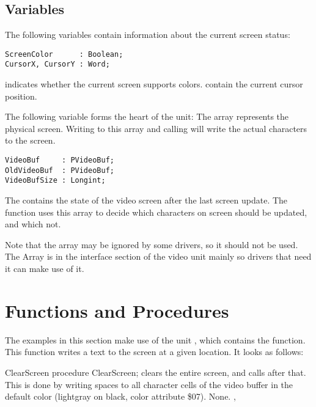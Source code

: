 \subsection{Variables}
The following variables contain information about the current screen
status:
\begin{verbatim}
ScreenColor      : Boolean;
CursorX, CursorY : Word;
\end{verbatim}
 indicates whether the current screen supports colors.
 contain the current cursor position.

The following variable forms the heart of the  unit: The
 array represents the physical screen. Writing to this
array and calling  will write the actual characters
to the screen. 
\begin{verbatim}
VideoBuf     : PVideoBuf;
OldVideoBuf  : PVideoBuf;
VideoBufSize : Longint;
\end{verbatim}
The  contains the state of the video screen after the last
screen update. The  function uses this array to decide
which characters on screen should be updated, and which not. 

Note that the  array may be ignored by some drivers, so
it should not be used. The Array is in the interface section of the video
unit mainly so drivers that need it can make use of it. 

\section{Functions and Procedures}

The examples in this section make use of the unit , which 
contains the  function. This function writes a text to the
screen at a given location. It looks as follows:


\begin{procedure}{ClearScreen}
\Declaration
procedure ClearScreen; 
\Description
{} clears the entire screen, and calls 
after that. This is done by writing spaces to all character cells of the
video buffer in the default color (lightgray on black, color attribute \$07).
\Errors
None.
\SeeAlso
{}, 
\end{procedure}


